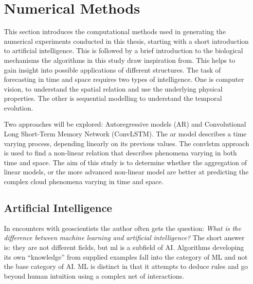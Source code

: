 \chapter{Numerical Methods} \label{ch:num_methods}
This section introduces the computational methods used in generating the numerical experiments conducted in this thesis, starting with a short introduction to artificial intelligence. This is followed by a brief introduction to the biological mechanisms the algorithms in this study draw inspiration from. This helps to gain insight into possible applications of different structures.
The task of forecasting in time and space requires two types of intelligence. One is computer vision, to understand the spatial relation and use the underlying physical properties. The other is sequential modelling to understand the temporal evolution.

Two approaches will be explored: Autoregressive models (AR) and Convolutional Long Short-Term Memory Network (ConvLSTM). The \acrshort{ar} model describes a time varying process, depending linearly on its previous values. The \acrshort{convlstm} approach is used to find a non-linear relation that describes phenomena varying in both time and space.
The aim of this study is to determine whether the aggregation of linear models, or the more advanced non-linear model are better at predicting the complex cloud phenomena varying in time and space.


\section{Artificial Intelligence} \label{sec:ai}

In encounters with geoscientists the author often gets the question: \textit{What is the difference between machine learning and artificial intelligence?} The short answer is: they are not different fields, but \acrshort{ml} is a subfield of AI. Algorithms developing its own ``knowledge'' from supplied examples fall into the category of ML and not the base category of AI. ML is distinct in that it attempts to deduce rules and go beyond human intuition using a complex net of interactions. 

